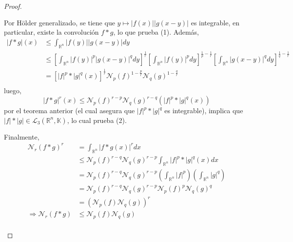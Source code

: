 \documentclass[12pt]{report}
\theoremstyle{largebreak}
\newcommand\abs[1]{\ensuremath{\big|#1\big|}}
\newcommand{\N}[2]{\ensuremath{\mathcal{N}_{#1}\left(#2\right)}}
\begin{document}
\begin{proof}
\begin{enumerate}
            Por Hölder generalizado, se tiene que $y\mapsto \abs{f(x)}\abs{g(x-y)}$ es integrable, en particular, existe la convolución $f*g$, lo que prueba (1). Además,
            \begin{equation*}
                \begin{split}
                    \abs{f*g}(x)&\leq \int_{\mathbb{R}^n}\abs{f(y)}\abs{g(x-y)}dy\\
                    &\leq \left[\int_{\mathbb{R}^n}\abs{f(y)}^p\abs{g(x-y)}^qdy\right]^{\frac{1}{r}} \left[\int_{\mathbb{R}^n}\abs{f(y)}^pdy \right]^{\frac{1}{p}-\frac{1}{r}}\left[\int_{\mathbb{R}^n}\abs{g(x-y)}^qdy \right]^{\frac{1}{q}-\frac{1}{r}}\\
                    &=\left[\abs{f}^p*\abs{g}^q(x) \right]^{\frac{1}{r}}\N{p}{f}^{1-\frac{p}{r}}\N{q}{g}^{1-\frac{q}{r}}\\
                \end{split}
            \end{equation*}
            luego,
            \begin{equation*}
                \abs{f*g}^r(x)\leq \N{p}{f}^{r-p}\N{q}{g}^{r-q}\left(\abs{f}^p*\abs{g}^q(x) \right)
            \end{equation*}
            por el teorema anterior (el cual asegura que $\abs{f}^p*\abs{g}^q$ es integrable), implica que $\abs{f}*\abs{g}\in\mathcal{L}_3(\mathbb{R}^n,\mathbb{K})$, lo cual prueba (2).

            Finalmente,
            \begin{equation*}
                \begin{split}
                    \N{r}{f*g}^r&=\int_{\mathbb{R}^n}\abs{f*g(x)}^rdx\\
                    &\leq \N{p}{f}^{r-q}\N{q}{g}^{r-p}\int_{\mathbb{R}^n}\abs{f}^p*\abs{g}^q(x)dx\\
                    &=\N{p}{f}^{r-q}\N{q}{g}^{r-p}\left(\int_{\mathbb{R}^n}\abs{f}^p\right)\left(\int_{\mathbb{R}^n}\abs{g}^q\right) \\
                    &=\N{p}{f}^{r-q}\N{q}{g}^{r-p}\N{p}{f}^{p}\N{q}{g}^q\\
                    &=\left(\N{p}{f}\N{q}{g}\right)^r \\
                    \Rightarrow \N{r}{f*g}&\leq \N{p}{f}\N{q}{g}\\
                \end{split}
            \end{equation*}


\end{enumerate}
\end{proof}
\end{document}
